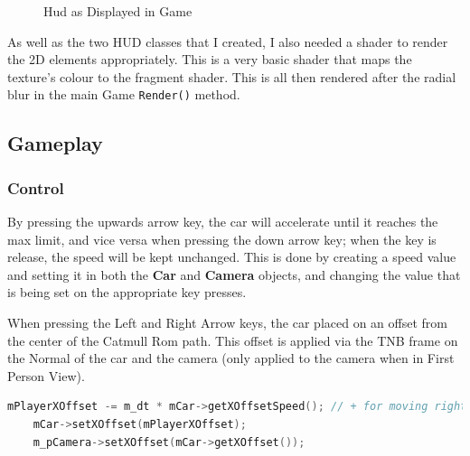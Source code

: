 \documentclass[10pt]{report}
\begin{document}
\begin{figure}[H]
    \centering
    \caption{Hud as Displayed in Game}
\end{figure}

As well as the two HUD classes that I created, I also needed a shader to render the 2D elements appropriately. This is a very basic shader that maps the texture's colour to the fragment shader. This is all then rendered after the radial blur in the main Game \colorbox{mygrey}{\lstinline{Render()}} method.

\subsection*{Gameplay}
\subsubsection*{Control}
By pressing the upwards arrow key, the car will accelerate until it reaches the max limit, and vice versa when pressing the down arrow key; when the key is release, the speed will be kept unchanged. This is done by creating a speed value and setting it in both the \textbf{Car} and \textbf{Camera} objects, and changing the value that is being set on the appropriate key presses.

When pressing the Left and Right Arrow keys, the car placed on an offset from the center of the Catmull Rom path. This offset is applied via the TNB frame on the Normal of the car and the camera (only applied to the camera when in First Person View).
\begin{lstlisting}[language=c]
    mPlayerXOffset -= m_dt * mCar->getXOffsetSpeed(); // + for moving right
    mCar->setXOffset(mPlayerXOffset);
    m_pCamera->setXOffset(mCar->getXOffset());
\end{lstlisting}
\end{document}
